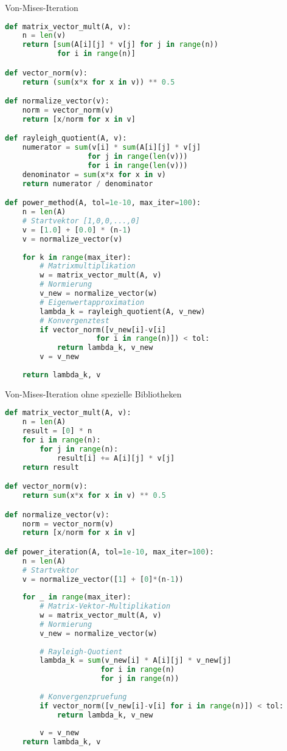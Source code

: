 \begin{examplecode}{Von-Mises-Iteration}
\begin{lstlisting}[language=Python, style=basesmol]
def matrix_vector_mult(A, v):
    n = len(v)
    return [sum(A[i][j] * v[j] for j in range(n)) 
            for i in range(n)]

def vector_norm(v):
    return (sum(x*x for x in v)) ** 0.5

def normalize_vector(v):
    norm = vector_norm(v)
    return [x/norm for x in v]

def rayleigh_quotient(A, v):
    numerator = sum(v[i] * sum(A[i][j] * v[j] 
                   for j in range(len(v))) 
                   for i in range(len(v)))
    denominator = sum(x*x for x in v)
    return numerator / denominator

def power_method(A, tol=1e-10, max_iter=100):
    n = len(A)
    # Startvektor [1,0,0,...,0]
    v = [1.0] + [0.0] * (n-1)
    v = normalize_vector(v)
    
    for k in range(max_iter):
        # Matrixmultiplikation
        w = matrix_vector_mult(A, v)
        # Normierung
        v_new = normalize_vector(w)
        # Eigenwertapproximation
        lambda_k = rayleigh_quotient(A, v_new)
        # Konvergenztest
        if vector_norm([v_new[i]-v[i] 
                     for i in range(n)]) < tol:
            return lambda_k, v_new
        v = v_new
    
    return lambda_k, v
\end{lstlisting}
\end{examplecode}

\begin{examplecode}{Von-Mises-Iteration ohne spezielle Bibliotheken}
\begin{lstlisting}[language=Python, style=basesmol]
def matrix_vector_mult(A, v):
    n = len(A)
    result = [0] * n
    for i in range(n):
        for j in range(n):
            result[i] += A[i][j] * v[j]
    return result

def vector_norm(v):
    return sum(x*x for x in v) ** 0.5

def normalize_vector(v):
    norm = vector_norm(v)
    return [x/norm for x in v]

def power_iteration(A, tol=1e-10, max_iter=100):
    n = len(A)
    # Startvektor
    v = normalize_vector([1] + [0]*(n-1))
    
    for _ in range(max_iter):
        # Matrix-Vektor-Multiplikation
        w = matrix_vector_mult(A, v)
        # Normierung
        v_new = normalize_vector(w)
        
        # Rayleigh-Quotient
        lambda_k = sum(v_new[i] * A[i][j] * v_new[j] 
                      for i in range(n) 
                      for j in range(n))
        
        # Konvergenzpruefung
        if vector_norm([v_new[i]-v[i] for i in range(n)]) < tol:
            return lambda_k, v_new
            
        v = v_new
    return lambda_k, v
\end{lstlisting}
\end{examplecode}

